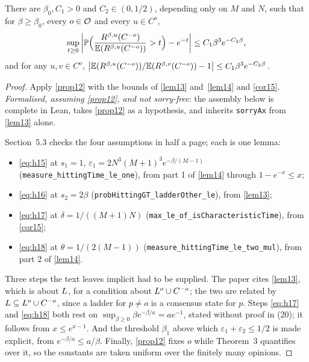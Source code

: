 \begin{theorem}[Metastability]
  \label{thm3}
  \leanok
  There are $\beta_0, C_1 > 0$ and $C_2 \in (0, 1/2)$, depending only on $M$ and
  $N$, such that for $\beta \ge \beta_0$, every $o \in \mathcal{O}$ and every
  $u \in C^o$,
  \[
    \sup_{t \ge 0} \left|
      \mathbb{P}\Bigl( \frac{R^{\beta,u}(C^{-o})}{\mathbb{E}(R^{\beta,u}(C^{-o}))} > t \Bigr)
      - e^{-t} \right| \le C_1 \beta^3 e^{-C_2 \beta},
  \]
  and for any $u, v \in C^o$,
  $\bigl| \mathbb{E}(R^{\beta,u}(C^{-o})) / \mathbb{E}(R^{\beta,v}(C^{-o})) - 1 \bigr|
   \le C_1 \beta^3 e^{-C_2 \beta}$.
\end{theorem}
\begin{proof}
  \leanok
  Apply \ref{prop12} with the bounds of \ref{lem13} and~\ref{lem14} and
  \ref{cor15}. \emph{Formalised, assuming \ref{prop12}, and not sorry-free}:
  the assembly below is complete in Lean, takes \ref{prop12} as a hypothesis,
  and inherits \texttt{sorryAx} from \ref{lem13} alone.

  Section~5.3 checks the four assumptions in half a page; each is one lemma:
  \begin{itemize}
    \item \eqref{eq:h15} at $s_1 = 1$,
      $\varepsilon_1 = 2N^3(M+1)^3 e^{-\beta/(M-1)}$
      (\texttt{measure\_hittingTime\_le\_one}), from part 1 of \ref{lem14}
      through $1 - e^{-x} \le x$;
    \item \eqref{eq:h16} at $s_2 = 2\beta$
      (\texttt{probHittingGT\_ladderOther\_le}), from \ref{lem13};
    \item \eqref{eq:h17} at $\delta = 1/((M+1)N)$
      (\texttt{max\_le\_of\_isCharacteristicTime}), from \ref{cor15};
    \item \eqref{eq:h18} at $\theta = 1/(2(M-1))$
      (\texttt{measure\_hittingTime\_le\_two\_mul}), from part 2 of
      \ref{lem14}.
  \end{itemize}

  Three steps the text leaves implicit had to be supplied.  The paper cites
  \ref{lem13}, which is about $L$, for a condition about $L^o \cup
  C^{-o}$; the two are related by $L \subseteq L^o \cup C^{-o}$,
  since a ladder for $p \ne o$ is a consensus state for $p$.  Steps
  \eqref{eq:h17} and \eqref{eq:h18} both rest on $\sup_{\beta \ge 0} \beta
  e^{-\beta/a} = a e^{-1}$, stated without proof in (20); it follows from $x
  \le e^{x-1}$.  And the threshold $\beta_1$ above which $\varepsilon_1 +
  \varepsilon_2 \le 1/2$ is made explicit, from $e^{-\beta/a} \le a/\beta$.
  Finally, \ref{prop12} fixes $o$ while Theorem~3 quantifies over it, so the
  constants are taken uniform over the finitely many opinions.
\end{proof}

